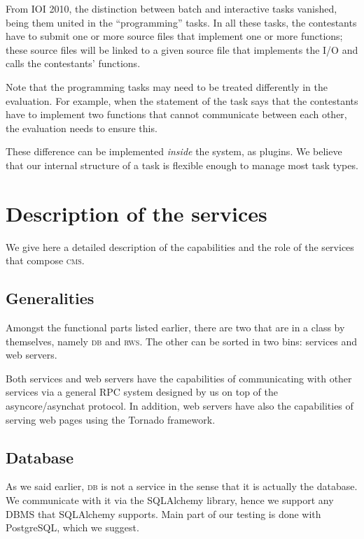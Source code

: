 \documentclass[a4paper,8pt]{amsart}
\newcommand{\CMS}{\textsc{cms}}
\newcommand{\DB}{\textsc{db}}
\newcommand{\RWS}{\textsc{rws}}
\begin{document}
\begin{multicols}{2}
  From IOI 2010, the distinction between batch and interactive tasks
  vanished, being them united in the ``programming'' tasks. In all
  these tasks, the contestants have to submit one or more source files
  that implement one or more functions; these source files will be
  linked to a given source file that implements the I/O and calls the
  contestants' functions.

  Note that the programming tasks may need to be treated differently
  in the evaluation. For example, when the statement of the task says
  that the contestants have to implement two functions that cannot
  communicate between each other, the evaluation needs to ensure this.

  These difference can be implemented \emph{inside} the system, as
  plugins. We believe that our internal structure of a task is
  flexible enough to manage most task types.

  \section{Description of the services}

  We give here a detailed description of the capabilities and the role
  of the services that compose \CMS{}.

  \subsection{Generalities}

  Amongst the functional parts listed earlier, there are two that are
  in a class by themselves, namely \DB{} and \RWS{}. The other can be
  sorted in two bins: services and web servers.

  Both services and web servers have the capabilities of communicating
  with other services via a general RPC system designed by us on top
  of the asyncore/asynchat protocol. In addition, web servers have
  also the capabilities of serving web pages using the Tornado
  framework.

  \subsection{Database}

  As we said earlier, \DB{} is not a service in the sense that it is
  actually the database. We communicate with it via the SQLAlchemy
  library, hence we support any DBMS that SQLAlchemy supports. Main
  part of our testing is done with PostgreSQL, which we suggest.


\end{multicols}
\end{document}
